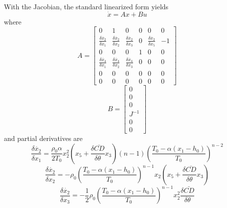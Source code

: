 \documentclass{article}
\begin{document}
  With the Jacobian, the standard linearized form yields
  \begin{equation}
    \dot{x} = Ax + Bu
  \end{equation}
  where
  \begin{equation}
    A = \left[\begin{matrix} 0 & 1 & 0 & 0 & 0 & 0                   \\
                             \frac{\delta \dot{x_2}}{\delta x_1} & \frac{\delta \dot{x_2}}{\delta x_2} & \frac{\delta \dot{x_2}}{\delta x_3} & 0 & \frac{\delta \dot{x_2}}{\delta x_5} & -1                      \\
                             0 & 0 & 0 & 1 & 0 & 0                    \\
                             \frac{\delta \dot{x_4}}{\delta x_1} & \frac{\delta \dot{x_4}}{\delta x_2} & \frac{\delta \dot{x_4}}{\delta x_3} & 0 & 0 & 0                      \\
                             0 & 0 & 0 & 0 & 0 & 0                      \\
                             0 & 0 & 0 & 0 & 0 & 0              \end{matrix}\right]
  \end{equation}
  \begin{equation}
    B = \left[\begin{matrix} 0 \\
                             0 \\
                             0 \\
                             J^{-1} \\
                             0 \\
                             0      \end{matrix}\right]
  \end{equation}
  and partial derivatives are
  \begin{equation}
    \frac{\delta \dot{x_2}}{\delta x_1} = \frac{\rho_0 \alpha}{2 T_0}x_2^2 \left( x_5 + \frac{\delta \bar{CD}}{\delta \theta} x_3 \right) \left( n-1 \right) \left( \frac{T_0-\alpha \left( x_1 - h_0\right)}{T_0} \right)^{n-2}
  \end{equation}
  \begin{equation}
    \frac{\delta \dot{x_2}}{\delta x_2} = -\rho_0 \left( \frac{T_0-\alpha \left( x_1 - h_0\right)}{T_0} \right)^{n-1} x_2 \left( x_5 + \frac{\delta \bar{CD}}{\delta \theta} x_3 \right)
  \end{equation}
  \begin{equation}
    \frac{\delta \dot{x_2}}{\delta x_3} = -\frac{1}{2}\rho_0 \left( \frac{T_0-\alpha \left( x_1 - h_0\right)}{T_0} \right)^{n-1} x_2^2 \frac{\delta \bar{CD}}{\delta \theta}
  \end{equation}
\end{document}
